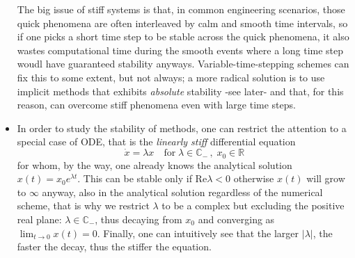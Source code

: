 \documentclass{digitaldynamics}
\begin{document}
\begin{itemize}
	The big issue of stiff systems is that, in common engineering scenarios, those quick phenomena are often interleaved by calm and smooth time intervals, 
	so if one picks a short time step to be stable across the quick phenomena, it also wastes computational time during the smooth events where a long time step 
	woudl have guaranteed stability anyways. Variable-time-stepping schemes can fix this to some extent, but not always; a more radical solution is to use 
	implicit methods that exhibits \textit{absolute} stability -see later- and that, for this reason, can overcome stiff phenomena even with large time steps.
	
	\item 
	In order to study the stability of methods, one can restrict the attention to a special case of ODE, that is the \textit{linearly stiff} differential equation
	\[
	\dot{x}= \lambda x  \quad \mathrm{for} \; \lambda \in \mathbb{C}_- \, , \; x_0 \in \mathbb{R}
	\]
	for whom, by the way, one already knows the analytical solution $x(t)=x_0 e^{\lambda t}$. This can be stable only if $\mathrm{Re} \lambda < 0$ otherwise $x(t)$ will grow to $\infty$ anyway, also in the analytical solution regardless of the numerical scheme, that is why we restrict $\lambda$ to be a complex but excluding the positive real plane: $\lambda \in \mathbb{C}_-$, thus decaying from $x_0$ and converging as $\lim_{t\rightarrow 0} x(t)=0$.
	Finally, one can intuitively see that the larger $|\lambda|$, the faster the decay, thus the stiffer the equation.
	

\end{itemize}
\end{document}
